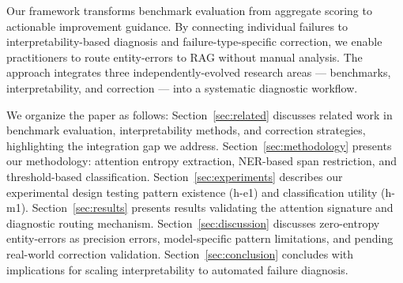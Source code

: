 Our framework transforms benchmark evaluation from aggregate scoring to actionable improvement guidance. By connecting individual failures to interpretability-based diagnosis and failure-type-specific correction, we enable practitioners to route entity-errors to RAG without manual analysis. The approach integrates three independently-evolved research areas --- benchmarks, interpretability, and correction --- into a systematic diagnostic workflow.

We organize the paper as follows: Section~\ref{sec:related} discusses related work in benchmark evaluation, interpretability methods, and correction strategies, highlighting the integration gap we address. Section~\ref{sec:methodology} presents our methodology: attention entropy extraction, NER-based span restriction, and threshold-based classification. Section~\ref{sec:experiments} describes our experimental design testing pattern existence (h-e1) and classification utility (h-m1). Section~\ref{sec:results} presents results validating the attention signature and diagnostic routing mechanism. Section~\ref{sec:discussion} discusses zero-entropy entity-errors as precision errors, model-specific pattern limitations, and pending real-world correction validation. Section~\ref{sec:conclusion} concludes with implications for scaling interpretability to automated failure diagnosis.

